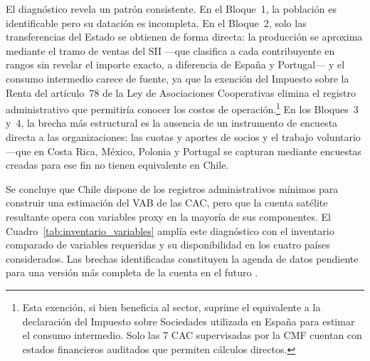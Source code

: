 El diagnóstico revela un patrón consistente. En el Bloque~1, la población es identificable pero su datación es incompleta. En el Bloque~2, solo las transferencias del Estado se obtienen de forma directa: la producción se aproxima mediante el tramo de ventas del SII ---que clasifica a cada contribuyente en rangos sin revelar el importe exacto, a diferencia de España y Portugal--- y el consumo intermedio carece de fuente, ya que la exención del Impuesto sobre la Renta del artículo~78 de la Ley de Asociaciones Cooperativas elimina el registro administrativo que permitiría conocer los costos de operación.\footnote{Esta exención, si bien beneficia al sector, suprime el equivalente a la declaración del Impuesto sobre Sociedades utilizada en España para estimar el consumo intermedio. Solo las 7 CAC supervisadas por la CMF cuentan con estados financieros auditados que permiten cálculos directos.} En los Bloques~3 y~4, la brecha más estructural es la ausencia de un instrumento de encuesta directa a las organizaciones: las cuotas y aportes de socios y el trabajo voluntario ---que en Costa Rica, México, Polonia y Portugal se capturan mediante encuestas creadas para ese fin 
no tienen equivalente en Chile.

Se concluye que Chile dispone de los registros administrativos mínimos para construir una estimación del VAB de las CAC, pero que la cuenta satélite resultante opera con variables proxy en la mayoría de sus componentes. El Cuadro~\ref{tab:inventario_variables} amplía este diagnóstico con el inventario comparado de variables requeridas y su disponibilidad en los cuatro países considerados. Las brechas identificadas constituyen la agenda de datos pendiente para una versión más completa de la cuenta en el futuro \cite{archambault_lester_2022}.



